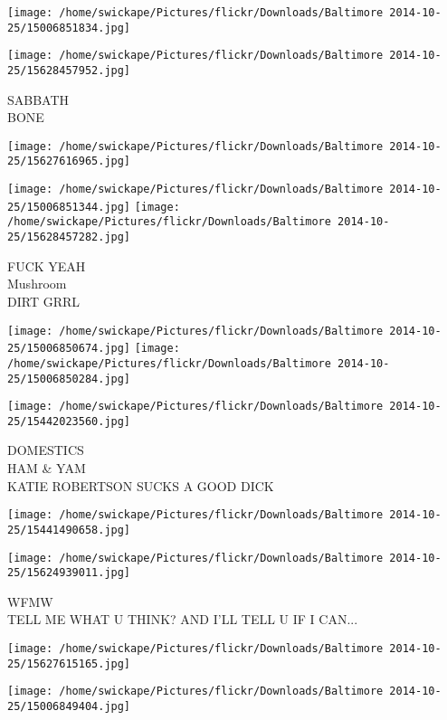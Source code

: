 \documentclass[10pt,letterpaper]{article}
\begin{document}
\texttt{[image: /home/swickape/Pictures/flickr/Downloads/Baltimore 2014-10-25/15006851834.jpg]}

\vspace{0.25in}
\texttt{[image: /home/swickape/Pictures/flickr/Downloads/Baltimore 2014-10-25/15628457952.jpg]}

SABBATH\\
BONE
\pagebreak

\texttt{[image: /home/swickape/Pictures/flickr/Downloads/Baltimore 2014-10-25/15627616965.jpg]}

\vspace{0.25in}
\texttt{[image: /home/swickape/Pictures/flickr/Downloads/Baltimore 2014-10-25/15006851344.jpg]}
\texttt{[image: /home/swickape/Pictures/flickr/Downloads/Baltimore 2014-10-25/15628457282.jpg]}

FUCK YEAH\\
Mushroom\\
DIRT GRRL
\pagebreak

\texttt{[image: /home/swickape/Pictures/flickr/Downloads/Baltimore 2014-10-25/15006850674.jpg]}
\texttt{[image: /home/swickape/Pictures/flickr/Downloads/Baltimore 2014-10-25/15006850284.jpg]}

\vspace{0.25in}
\texttt{[image: /home/swickape/Pictures/flickr/Downloads/Baltimore 2014-10-25/15442023560.jpg]}

DOMESTICS\\
HAM \& YAM\\
KATIE ROBERTSON SUCKS A GOOD DICK
\pagebreak

\texttt{[image: /home/swickape/Pictures/flickr/Downloads/Baltimore 2014-10-25/15441490658.jpg]}

\vspace{0.25in}
\texttt{[image: /home/swickape/Pictures/flickr/Downloads/Baltimore 2014-10-25/15624939011.jpg]}

WFMW\\
TELL ME WHAT U THINK?  AND I'LL TELL U IF I CAN...
\pagebreak

\texttt{[image: /home/swickape/Pictures/flickr/Downloads/Baltimore 2014-10-25/15627615165.jpg]}

\vspace{0.25in}
\texttt{[image: /home/swickape/Pictures/flickr/Downloads/Baltimore 2014-10-25/15006849404.jpg]}
\end{document}

